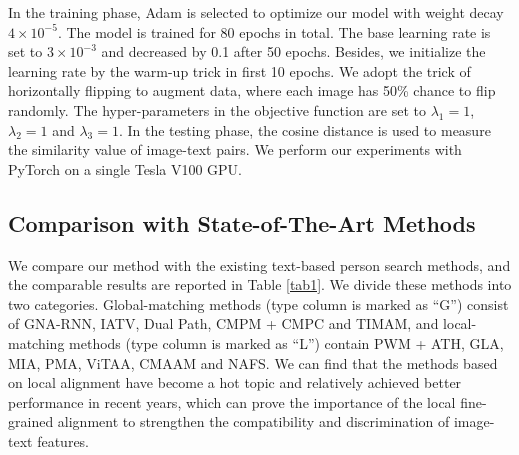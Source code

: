 \documentclass[review]{elsarticle}
\begin{document}
In the training phase, Adam is selected to optimize our model with weight decay $4 \times {10^{ - 5}}$. The model is trained for 80 epochs in total. The base learning rate is set to $3 \times {10^{ - 3}}$ and decreased by 0.1 after 50 epochs. Besides, we initialize the learning rate by the warm-up trick in first 10 epochs. We adopt the trick of horizontally flipping to augment data, where each image has 50\% chance to flip randomly. The hyper-parameters in the objective function are set to ${\lambda _1} = 1$, ${\lambda _2} = 1$ and ${\lambda _3} = 1$. In the testing phase, the cosine distance is used to measure the similarity value of image-text pairs. We perform our experiments with PyTorch on a single Tesla V100 GPU.

\subsection{Comparison with State-of-The-Art Methods}
We compare our method with the existing text-based person search methods, and the comparable results are reported in Table \ref{tab1}. We divide these methods into two categories. Global-matching methods (type column is marked as “G”) consist of GNA-RNN, IATV, Dual Path, CMPM + CMPC and TIMAM, and local-matching methods (type column is marked as “L”) contain PWM + ATH, GLA, MIA, PMA, ViTAA, CMAAM and NAFS. We can find that the methods based on local alignment have become a hot topic and relatively achieved better performance in recent years, which can prove the importance of the local fine-grained alignment to strengthen the compatibility and discrimination of image-text features. 
\end{document}
